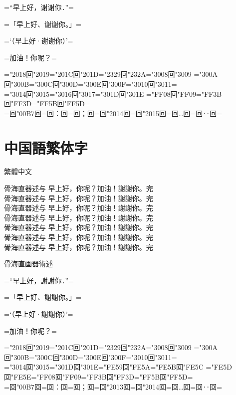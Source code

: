 \documentclass{ujarticle}
\begin{document}
\upschrmm
=“早上好，谢谢你．”=

=「早上好、谢谢你。」=

=‘（早上好·谢谢你）’=

=加油！你呢？=

=\kchar"2018回\kchar"2019=\kchar"201C回\kchar"201D=\kchar"2329回\kchar"232A=\kchar"3008回\kchar"3009%
=\kchar"300A回\kchar"300B=\kchar"300C回\kchar"300D=\kchar"300E回\kchar"300F=\kchar"3010回\kchar"3011=\\
=\kchar"3014回\kchar"3015=\kchar"3016回\kchar"3017=\kchar"301D回\kchar"301E%
=\kchar"FF08回\kchar"FF09=\kchar"FF3B回\kchar"FF3D=\kchar"FF5B回\kchar"FF5D=\\
=回\kchar"00B7回=回：回=回；回=回\kchar"2014回=回\kchar"2015回=回…回=回‥回=


\newpage

\section{中国語繁体字}
\upschgtb 繁體中文

\uptchrml 骨海直器述与 早上好，你呢？加油！謝謝你。完\\
\uptchrmm 骨海直器述与 早上好，你呢？加油！謝謝你。完\\
\uptchrmb 骨海直器述与 早上好，你呢？加油！謝謝你。完\\
\uptchgtm 骨海直器述与 早上好，你呢？加油！謝謝你。完\\
\uptchgtb 骨海直器述与 早上好，你呢？加油！謝謝你。完\\
\uptchgte 骨海直器述与 早上好，你呢？加油！謝謝你。完\\
\uptchgth 骨海直器述与 早上好，你呢？加油！謝謝你。完\\

\uptchrmm

骨海直画器術述

=“早上好，謝謝你．”=

=「早上好、謝謝你。」=

=‘（早上好·謝謝你）’=

=加油！你呢？=

=\kchar"2018回\kchar"2019=\kchar"201C回\kchar"201D=\kchar"2329回\kchar"232A=\kchar"3008回\kchar"3009%
=\kchar"300A回\kchar"300B=\kchar"300C回\kchar"300D=\kchar"300E回\kchar"300F=\kchar"3010回\kchar"3011=\\
=\kchar"3014回\kchar"3015=\kchar"301D回\kchar"301E=\kchar"FE59回\kchar"FE5A=\kchar"FE5B回\kchar"FE5C%
=\kchar"FE5D回\kchar"FE5E=\kchar"FF08回\kchar"FF09=\kchar"FF3B回\kchar"FF3D=\kchar"FF5B回\kchar"FF5D=\\
=回\kchar"00B7回=回：回=回；回=回\kchar"2013回=回\kchar"2014回=回…回=回‥回=
\end{document}
